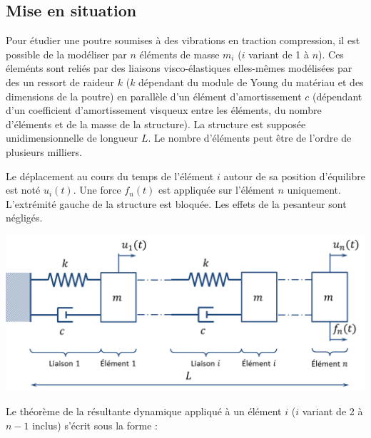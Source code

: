 \documentclass[10pt,fleqn]{article} %
\begin{document}

\vspace{10cm}
\pagestyle{fancy}
\thispagestyle{plain}


\def\columnseprulecolor{\color{ocre}}
\setlength{\columnseprule}{0.4pt} 
\begin{multicols}{2}

\section*{Mise en situation}

Pour étudier une poutre soumises à des vibrations en traction compression, il est possible de la modéliser par $n$ éléments de masse $m_i$ ($i$ variant de 1 à $n$). Ces éleménts sont reliés par des liaisons visco-élastiques elles-mêmes modélisées par des un ressort de raideur $k$ ($k$ dépendant du module de Young du matériau et des dimensions de la poutre) en parallèle d'un élément d'amortissement $c$ (dépendant d'un coefficient d'amortissement visqueux entre les éléments, du nombre d'éléments et de la masse de la structure). La structure est supposée unidimensionnelle de longueur $L$. Le nombre d'éléments peut être de l'ordre de plusieurs milliers. 

Le déplacement au cours du temps de l'élément $i$ autour de sa position d'équilibre est noté $u_i(t)$. Une force $f_n(t)$ est appliquée sur l'élément $n$ uniquement. L'extrémité gauche de
la structure est bloquée. Les effets de la pesanteur sont négligés.
\begin{center}
\includegraphics[width=.49\textwidth]{images/structure}
\end{center}



Le théorème de la résultante dynamique appliqué à un élément $i$ ($i$ variant de 2 à $n-1$ inclus) s'écrit sous la forme : 




\end{multicols}
\end{document}
